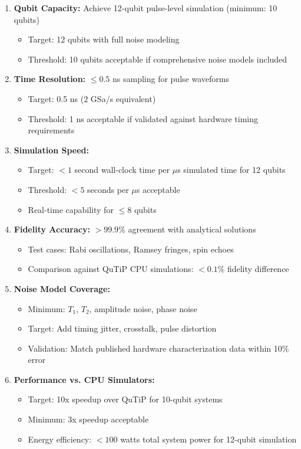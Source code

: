 \documentclass[12pt,a4paper]{article}
\begin{document}
\begin{enumerate}[noitemsep]
\item \textbf{Qubit Capacity:} Achieve 12-qubit pulse-level simulation (minimum: 10 qubits)
   \begin{itemize}[noitemsep]
   \item Target: 12 qubits with full noise modeling
   \item Threshold: 10 qubits acceptable if comprehensive noise models included
   \end{itemize}

\item \textbf{Time Resolution:} $\leq 0.5$ ns sampling for pulse waveforms
   \begin{itemize}[noitemsep]
   \item Target: 0.5 ns (2 GSa/s equivalent)
   \item Threshold: 1 ns acceptable if validated against hardware timing requirements
   \end{itemize}

\item \textbf{Simulation Speed:}
   \begin{itemize}[noitemsep]
   \item Target: $<1$ second wall-clock time per $\mu$s simulated time for 12 qubits
   \item Threshold: $<5$ seconds per $\mu$s acceptable
   \item Real-time capability for $\leq 8$ qubits
   \end{itemize}

\item \textbf{Fidelity Accuracy:} $>99.9\%$ agreement with analytical solutions
   \begin{itemize}[noitemsep]
   \item Test cases: Rabi oscillations, Ramsey fringes, spin echoes
   \item Comparison against QuTiP CPU simulations: $<0.1\%$ fidelity difference
   \end{itemize}

\item \textbf{Noise Model Coverage:}
   \begin{itemize}[noitemsep]
   \item Minimum: $T_1$, $T_2$, amplitude noise, phase noise
   \item Target: Add timing jitter, crosstalk, pulse distortion
   \item Validation: Match published hardware characterization data within 10\% error
   \end{itemize}

\item \textbf{Performance vs. CPU Simulators:}
   \begin{itemize}[noitemsep]
   \item Target: 10x speedup over QuTiP for 10-qubit systems
   \item Minimum: 3x speedup acceptable
   \item Energy efficiency: $<100$ watts total system power for 12-qubit simulation
   \end{itemize}
\end{enumerate}
\end{document}
